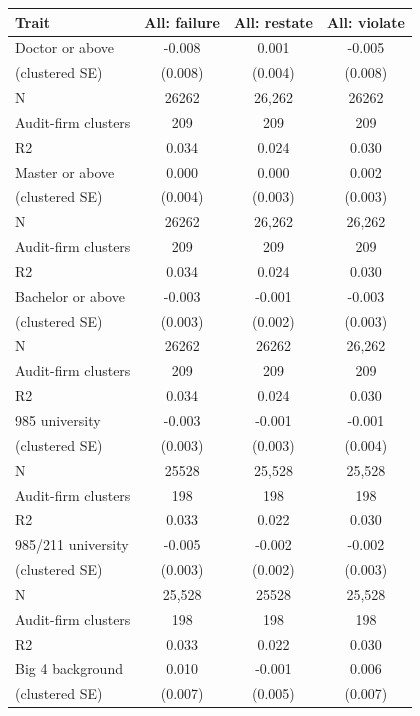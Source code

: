 \documentclass[10pt]{article}
\begin{document}
\begin{minipage}{19cm}\fontsize{10}{12}\selectfont\setlength{\tabcolsep}{4pt}\renewcommand{\arraystretch}{1.12}


\centering
{}
\begin{threeparttable}
\begin{tabular}{p{}ccc}
\toprule
Trait & All: failure & All: restate & All: violate \\
\midrule
Doctor or above & -0.008 & 0.001 & -0.005 \\
(clustered SE) & (0.008) & (0.004) & (0.008) \\
N & 26262 & 26,262 & 26262 \\
Audit-firm clusters & 209 & 209 & 209 \\
R2 & 0.034 & 0.024 & 0.030 \\
Master or above & 0.000 & 0.000 & 0.002 \\
(clustered SE) & (0.004) & (0.003) & (0.003) \\
N & 26262 & 26,262 & 26,262 \\
Audit-firm clusters & 209 & 209 & 209 \\
R2 & 0.034 & 0.024 & 0.030 \\
Bachelor or above & -0.003 & -0.001 & -0.003 \\
(clustered SE) & (0.003) & (0.002) & (0.003) \\
N & 26262 & 26262 & 26,262 \\
Audit-firm clusters & 209 & 209 & 209 \\
R2 & 0.034 & 0.024 & 0.030 \\
985 university & -0.003 & -0.001 & -0.001 \\
(clustered SE) & (0.003) & (0.003) & (0.004) \\
N & 25528 & 25,528 & 25,528 \\
Audit-firm clusters & 198 & 198 & 198 \\
R2 & 0.033 & 0.022 & 0.030 \\
985/211 university & -0.005 & -0.002 & -0.002 \\
(clustered SE) & (0.003) & (0.002) & (0.003) \\
N & 25,528 & 25528 & 25,528 \\
Audit-firm clusters & 198 & 198 & 198 \\
R2 & 0.033 & 0.022 & 0.030 \\
Big 4 background & 0.010 & -0.001 & 0.006 \\
(clustered SE) & (0.007) & (0.005) & (0.007) \\

\end{tabular}
\end{threeparttable}
\end{minipage}
\end{document}
